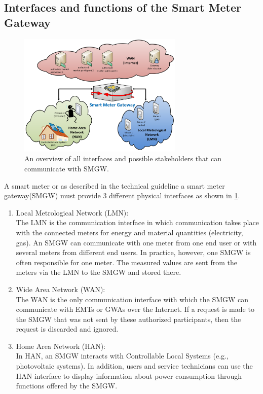 \subsection{Interfaces and functions of the Smart Meter Gateway}
\begin{figure}[tbp]
  \centering
  \includegraphics[width=0.7\textwidth]{images/interfaces_eng.png}
  \caption[Smart Meter Gateway Interfaces]{An overview of all interfaces and possible stakeholders that can communicate with SMGW.}
  \label{fig:Smart_Meter_Interfaces}
\end{figure}
A smart meter or as described in the technical guideline a smart meter gateway(SMGW) must provide 3 different physical interfaces as shown in \ref{fig:Smart_Meter_Interfaces}.
\begin{enumerate}
\item Local Metrological Network (LMN):\\
The LMN is the communication interface in which communication takes place with the connected meters for energy and material quantities (electricity, gas). An SMGW can communicate with one meter from one end user or with several meters from different end users. In practice, however, one SMGW is often responsible for one meter. The measured values are sent from the meters via the LMN to the SMGW and stored there.
\item Wide Area Network (WAN):\\
The WAN is the only communication interface with which the SMGW can communicate with EMTs or GWAs over the Internet. If a request is made to the SMGW that was not sent by these authorized participants, then the request is discarded and ignored.
\item Home Area Network (HAN):\\
In HAN, an SMGW interacts with Controllable Local Systems (e.g., photovoltaic systems). In addition, users and service technicians can use the HAN interface to display information about power consumption through functions offered by the SMGW.
\end{enumerate}
